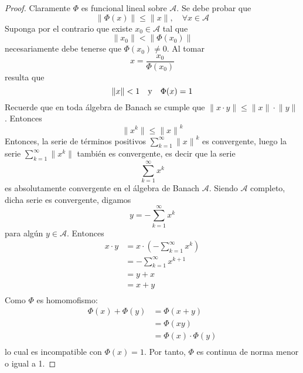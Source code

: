 \documentclass[12pt]{report}
\theoremstyle{largebreak}
\renewcommand{\leq}{\ensuremath{\leqslant}}
\newcommand\norm[1]{\ensuremath{\|#1\|}}
\begin{document}
    \begin{proof}
        Claramente $\Phi$ es funcional lineal sobre $\mathcal{A}$. Se debe probar que
        \begin{equation*}
            \norm{\Phi(x)}\leq\norm{x},\quad\forall x\in\mathcal{A}
        \end{equation*}
        Suponga por el contrario que existe $x_0\in\mathcal{A}$ tal que
        \begin{equation*}
            \norm{x_0}<\norm{\Phi(x_0)}
        \end{equation*}
        necesariamente debe tenerse que $\Phi(x_0)\neq0$. Al tomar
        \begin{equation*}
            x=\frac{x_0}{\Phi(x_0)}
        \end{equation*}
        resulta que
        \begin{equation*}
            \norm{x}<1\quad\textup{y}\quad\Phi(x)=1
        \end{equation*}
        Recuerde que en toda álgebra de Banach se cumple que $\norm{x\cdot y}\leq\norm{x}\cdot\norm{y}$. Entonces
        \begin{equation*}
            \norm{x^k}\leq\norm{x}^k
        \end{equation*}
        Entonces, la serie de términos positivos $\sum_{ k=1}^\infty\norm{x}^k$ es convergente, luego la serie $\sum_{ k=1}^\infty\norm{x^k}$ también es convergente, es decir que la serie
        \begin{equation*}
            \sum_{ k=1}^\infty x^k
        \end{equation*}
        es absolutamente convergente en el álgebra de Banach $\mathcal{A}$. Siendo $\mathcal{A}$ completo, dicha serie es convergente, digamos
        \begin{equation*}
            y=-\sum_{ k=1}^\infty x^k
        \end{equation*}
        para algún $y\in\mathcal{A}$. Entonces
        \begin{equation*}
            \begin{split}
                x\cdot y&=x\cdot\left(-\sum_{ k=1}^\infty x^k\right)\\
                &=-\sum_{ k=1}^\infty x^{ k+1}\\
                &=y+x\\
                &=x+y\\
            \end{split}
        \end{equation*}
        Como $\Phi$ es homomofismo:
        \begin{equation*}
            \begin{split}
                \Phi(x)+\Phi(y)&=\Phi(x+y)\\
                &=\Phi(x y)\\
                &=\Phi(x)\cdot\Phi(y)\\
            \end{split}
        \end{equation*}
        lo cual es incompatible con $\Phi(x)=1$. Por tanto, $\Phi$ es continua de norma menor o igual a 1.
    \end{proof}
\end{document}
